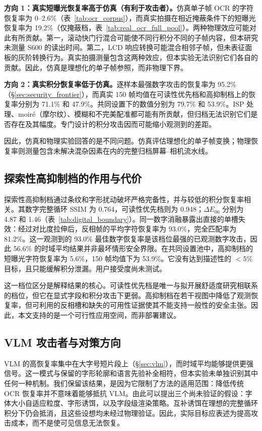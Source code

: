 \documentclass{ieeeaccess}
\begin{document}
\textbf{方向 1：真实短曝光恢复率高于仿真（有利于攻击者）。}仿真单子帧 OCR 的字符恢复率为 0--2.6\%（表~\ref{tab:ocr_corpus}），而真实拍摄在相近掩蔽条件下的短曝光恢复率为 19.2\%（仅掩蔽档，表~\ref{tab:real_ocr_full_pool}）。两种物理效应可能对此有所贡献。第一，滚动快门行混合可能使不同行积分不同的子帧内容，但本研究未测量 S600 的读出时间。第二，LCD 响应转换可能混合相邻子帧，但未表征面板的灰阶转换行为。真实拍摄测量包含这两种效应，但本实验无法识别它们各自的贡献。因此，仿真是理想化的单子帧参照，而非物理下界。

\textbf{方向 2：真实积分恢复率低于仿真。}逐样本最强数字攻击的恢复率为 95.2\%（\S\ref{sec:security_frontier}），而真实 150 帧均值在可读性优先档和高抑制档上的恢复率分别为 71.1\% 和 47.9\%。共同设置下的数值分别为 79.7\% 和 53.9\%。ISP 处理、moir\'{e}（摩尔纹）、模糊和不完美配准都可能有所贡献，但归档无法识别它们是否存在及其幅度。专门设计的积分攻击因而可能缩小观测到的差距。

因此，仿真和物理实验回答的是不同问题。仿真评估理想化的单子帧变换；物理恢复率则测量包含未解决混杂因素在内的完整归档屏幕--相机流水线。

\subsection{探索性高抑制档的作用与代价}

探索性高抑制档通过条纹和字形扰动破坏严格完备性，并与较低的积分恢复率相关。其数字完整循环 SSIM 为 0.764，可读性优先档则为 0.948；$\Delta E_{00}$ 分别为 4.87 和 1.46（表~\ref{tab:digital_boundary}）。同一数字消融暴露出直接的单槽失效：经过对比度拉伸后，反相帧的平均字符恢复率为 93.0\%，完全匹配率为 81.2\%。这一观测到的 93.0\% 最佳数字恢复率是该档位最强的已观测数字攻击，因此 56.6\% 的时域平均结果并非最坏情形安全界限。在共同设置池中，高抑制档的短曝光字符恢复率为 5.6\%，150 帧均值下为 53.9\%。它没有达到描述性的 $<5\%$ 目标，且只能缓解积分泄漏。用户接受度尚未测试。

这一档位区分是解释结果的核心。可读性优先档是唯一与拟开展舒适度研究相联系的档位，但它在显式字段和积分攻击下更弱。高抑制档在若干视图中降低了观测恢复率，但可利用的反相槽和缺失的可用性证据使其不能支持一般性的安全主张。因此，本文支持的是一个可行性应用空间，而非部署建议。

\subsection{VLM 攻击者与对策方向}
\label{sec:vlm_defense}

VLM 的高恢复率集中在大字号短片段上（\S\ref{sec:vlm}），而时域平均能够提供更强信号。这一模式与保留的字形轮廓和语言先验补全相符，但本实验未单独识别其中任何一种机制。我们保留该结果，是因为它限制了方法的适用范围：降低传统 OCR 恢复率并不意味着能够抵抗 VLM。由此可以提出三个尚未验证的假设：字体大小自适应粒度、字形诱饵，以及字段级渲染策略。互补诱饵在理想的完整循环积分下仍会抵消，且这些设想均未经过物理验证。因此，实际目标应表述为提高攻击成本，而不是使可见信息无法恢复。
\end{document}
